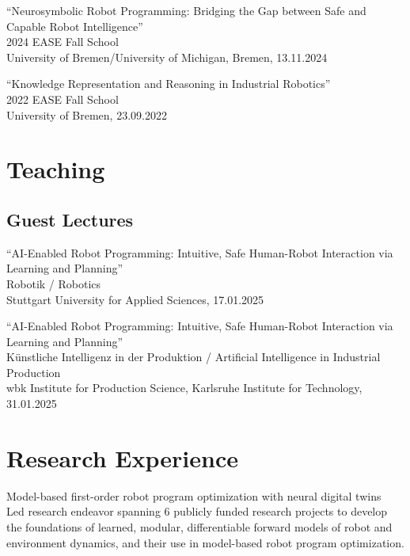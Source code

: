 \documentclass[11pt]{article} %
\begin{document}
``Neurosymbolic Robot Programming: Bridging the Gap between Safe and Capable Robot Intelligence''\\
2024 EASE Fall School\\
University of Bremen/University of Michigan, Bremen, 13.11.2024

\medskip

``Knowledge Representation and Reasoning in Industrial Robotics''\\
2022 EASE Fall School\\
University of Bremen, 23.09.2022


\section*{Teaching}

\subsection*{Guest Lectures}


``AI-Enabled Robot Programming: Intuitive, Safe Human-Robot Interaction via Learning and Planning''\\
Robotik / Robotics\\
Stuttgart University for Applied Sciences, 17.01.2025

\medskip

``AI-Enabled Robot Programming: Intuitive, Safe Human-Robot Interaction via Learning and Planning''\\
Künstliche Intelligenz in der Produktion / Artificial Intelligence in Industrial Production\\
wbk Institute for Production Science, Karlsruhe Institute for Technology, 31.01.2025


\section*{Research Experience}

Model-based first-order robot program optimization with neural digital twins\\
Led research endeavor spanning 6 publicly funded research projects to develop the foundations of learned, modular, differentiable forward models of robot and environment dynamics, and their use in model-based robot program optimization.
\end{document}
